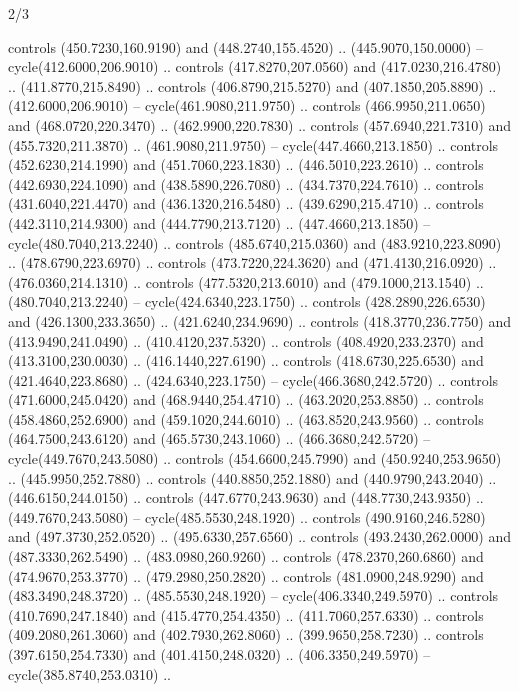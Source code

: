 \begin{flagdescription}{2/3}
\begin{scope}[xshift=0.5\flaglength]
\begin{scope}[scale=0.0021\flagwidth,yshift=167.8mm,xshift=-125.3mm]
\begin{scope}[y=-0.8pt, x=0.8pt, inner sep=0pt, outer sep=0pt]
  controls (450.7230,160.9190) and (448.2740,155.4520) .. (445.9070,150.0000) --
  cycle(412.6000,206.9010) .. controls (417.8270,207.0560) and
  (417.0230,216.4780) .. (411.8770,215.8490) .. controls (406.8790,215.5270) and
  (407.1850,205.8890) .. (412.6000,206.9010) -- cycle(461.9080,211.9750) ..
  controls (466.9950,211.0650) and (468.0720,220.3470) .. (462.9900,220.7830) ..
  controls (457.6940,221.7310) and (455.7320,211.3870) .. (461.9080,211.9750) --
  cycle(447.4660,213.1850) .. controls (452.6230,214.1990) and
  (451.7060,223.1830) .. (446.5010,223.2610) .. controls (442.6930,224.1090) and
  (438.5890,226.7080) .. (434.7370,224.7610) .. controls (431.6040,221.4470) and
  (436.1320,216.5480) .. (439.6290,215.4710) .. controls (442.3110,214.9300) and
  (444.7790,213.7120) .. (447.4660,213.1850) -- cycle(480.7040,213.2240) ..
  controls (485.6740,215.0360) and (483.9210,223.8090) .. (478.6790,223.6970) ..
  controls (473.7220,224.3620) and (471.4130,216.0920) .. (476.0360,214.1310) ..
  controls (477.5320,213.6010) and (479.1000,213.1540) .. (480.7040,213.2240) --
  cycle(424.6340,223.1750) .. controls (428.2890,226.6530) and
  (426.1300,233.3650) .. (421.6240,234.9690) .. controls (418.3770,236.7750) and
  (413.9490,241.0490) .. (410.4120,237.5320) .. controls (408.4920,233.2370) and
  (413.3100,230.0030) .. (416.1440,227.6190) .. controls (418.6730,225.6530) and
  (421.4640,223.8680) .. (424.6340,223.1750) -- cycle(466.3680,242.5720) ..
  controls (471.6000,245.0420) and (468.9440,254.4710) .. (463.2020,253.8850) ..
  controls (458.4860,252.6900) and (459.1020,244.6010) .. (463.8520,243.9560) ..
  controls (464.7500,243.6120) and (465.5730,243.1060) .. (466.3680,242.5720) --
  cycle(449.7670,243.5080) .. controls (454.6600,245.7990) and
  (450.9240,253.9650) .. (445.9950,252.7880) .. controls (440.8850,252.1880) and
  (440.9790,243.2040) .. (446.6150,244.0150) .. controls (447.6770,243.9630) and
  (448.7730,243.9350) .. (449.7670,243.5080) -- cycle(485.5530,248.1920) ..
  controls (490.9160,246.5280) and (497.3730,252.0520) .. (495.6330,257.6560) ..
  controls (493.2430,262.0000) and (487.3330,262.5490) .. (483.0980,260.9260) ..
  controls (478.2370,260.6860) and (474.9670,253.3770) .. (479.2980,250.2820) ..
  controls (481.0900,248.9290) and (483.3490,248.3720) .. (485.5530,248.1920) --
  cycle(406.3340,249.5970) .. controls (410.7690,247.1840) and
  (415.4770,254.4350) .. (411.7060,257.6330) .. controls (409.2080,261.3060) and
  (402.7930,262.8060) .. (399.9650,258.7230) .. controls (397.6150,254.7330) and
  (401.4150,248.0320) .. (406.3350,249.5970) -- cycle(385.8740,253.0310) ..

\end{scope}
\end{scope}
\end{scope}
\end{flagdescription}

